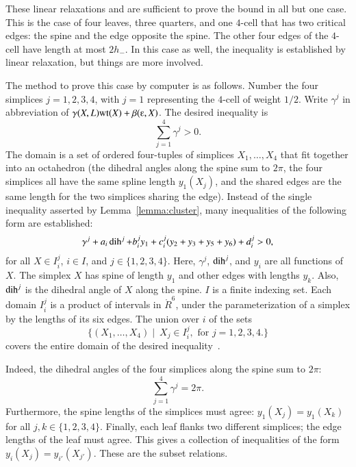 These linear relaxations and are sufficient to prove the bound in all
but one case.  This is the case of four leaves, three quarters, and
one $4$-cell that has two critical edges: the spine and the edge
opposite the spine.  The other four edges of the $4$-cell have length
at most $2h_-$.  In this case as well, the inequality is established
by linear relaxation, but things are more involved.

The method to prove this case by computer is as follows.  Number the
four simplices $j=1,2,3,4$, with $j=1$ representing the $4$-cell of
weight $1/2$.  Write $\gamma^j$ in abbreviation of
$\gamma(X,L)\op{wt}(X) + \beta(\ee,X)$.  The desired inequality is
\begin{equation}\label{eqn:gpos} 
\sum_{j=1}^4 \gamma^j > 0.
\end{equation}
The domain is a set of ordered four-tuples of simplices
$X_1,\ldots,X_4$ that fit together into an octahedron (the dihedral
angles along the spine sum to $2\pi$, the four simplices all have the
same spline length $y_1(X_j)$, and the shared edges are the same
length for the two simplices sharing the edge).  Instead of the single
inequality asserted by Lemma~\ref{lemma:cluster}, many inequalities of
the following form are established:
\begin{equation}\label{eqn:gpart} 
\gamma^j + a_i \operatorname{dih}^j + b_i^j y_1 + c_i^j (y_2+y_3+y_5+y_6) + d_i^j > 0, 
\end{equation}
for all $X \in I_i^j$, \quad $i \in I$, and $j\in \{1,2,3,4\}$.  Here,
$\gamma^j$, $\operatorname{dih}^j$, and $y_i$ are all functions of $X$.  The simplex
$X$ has spine of length $y_1$ and other edges with lengths $y_k$.
Also, $\operatorname{dih}^j$ is the dihedral angle of $X$ along the spine.  $I$ is a
finite indexing set.  Each domain $I_i^j$ is a product of intervals in
$\ring{R}^6$, under the parameterization of a simplex by the lengths
of its six edges.  The union over $i$ of the sets
\[  
\{(X_1,\ldots,X_4)\mid~ X_j \in I_i^j,\text{ for } j=1,2,3,4.\}
\] 
covers the entire domain of the desired inequality~.   

  Indeed, the
dihedral angles of the four simplices along the spine sum to $2\pi$:
\[  
\sum_{j=1}^4 \gamma^j = 2\pi.
\] 
Furthermore, the spine lengths of the simplices must agree: $y_1(X_j)
= y_1(X_k)$ for all $j,k\in\{1,2,3,4\}$.  Finally, each leaf flanks
two different simplices; the edge lengths of the leaf must agree.
This gives a collection of inequalities of the form $y_i(X_j) =
y_{i'}(X_{j'})$.  These are the subset relations.

